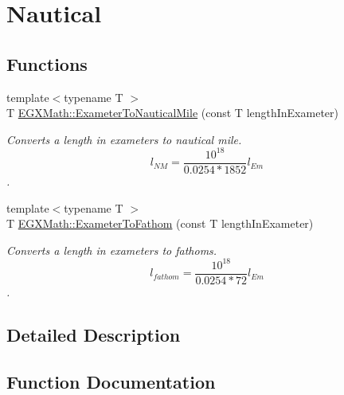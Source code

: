 \hypertarget{group___e_g_x_math-_conversions-_length_conversions-_s_i-_exameter-_nautical}{}\section{Nautical}
\label{group___e_g_x_math-_conversions-_length_conversions-_s_i-_exameter-_nautical}
\subsection*{Functions}
\begin{DoxyCompactItemize}
\item 
{\footnotesize template$<$typename T $>$ }\\T \mbox{\hyperlink{group___e_g_x_math-_conversions-_length_conversions-_s_i-_exameter-_nautical_gaf593ae9d78bd889caca4e9249be1464a}{E\+G\+X\+Math\+::\+Exameter\+To\+Nautical\+Mile}} (const T length\+In\+Exameter)
\begin{DoxyCompactList}\small\item\em Converts a length in exameters to nautical mile. \[ l_{NM}= \frac{10^{18}}{0.0254 * 1852} l_{Em} \]. \end{DoxyCompactList}\item 
{\footnotesize template$<$typename T $>$ }\\T \mbox{\hyperlink{group___e_g_x_math-_conversions-_length_conversions-_s_i-_exameter-_nautical_gab6f73111fd59a46fb28473d73ddb6033}{E\+G\+X\+Math\+::\+Exameter\+To\+Fathom}} (const T length\+In\+Exameter)
\begin{DoxyCompactList}\small\item\em Converts a length in exameters to fathoms. \[ l_{fathom}= \frac{10^{18}}{0.0254 * 72} l_{Em} \]. \end{DoxyCompactList}\end{DoxyCompactItemize}


\subsection{Detailed Description}


\subsection{Function Documentation}
\mbox{\label{group___e_g_x_math-_conversions-_length_conversions-_s_i-_exameter-_nautical_gab6f73111fd59a46fb28473d73ddb6033}} 
